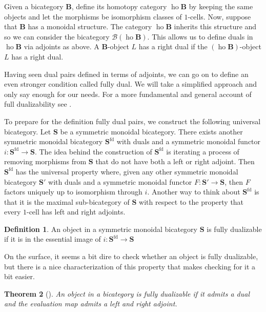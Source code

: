 \documentclass[11pt]{amsart}
\newcommand{\op}[1]{\operatorname{#1}}
\newcommand{\cat}[1]{\mathbf{#1}}
\newcommand{\from}{\colon}
\newtheorem{thm}{Theorem}[section]
\theoremstyle{remark}
\theoremstyle{definition}
\newtheorem{defn}[thm]{Definition}
\begin{document}
Given a bicategory $\cat{B}$, define its homotopy category $\op{ho} \cat{B}$ by keeping the same objects and let the morphisms be isomorphism classes of $1$-cells. Now, suppose that $\cat{B}$ has a monoidal structure. The category $\op{ho} \cat{B}$ inherits this structure and so we can consider the bicategory $\mathcal{B} (\op{ho} \cat{B})$. This allows us to define duals in $\op{ho}\cat{B}$ via adjoints as above. A $\cat{B}$-object $L$ has a right dual if the $(\op{ho} \cat{B})$-object $L$ has a right dual.

Having seen dual pairs defined in terms of adjoints, we can go on to define an even stronger condition called fully dual.  We will take a simplified approach and only say enough for our needs. For a more fundamental and general account of full dualizability see \cite{Lurie,Piotr}. 

To prepare for the definition fully dual pairs, we construct the following universal bicategory. Let $\cat{S}$ be a symmetric monoidal bicategory. There exists another symmetric monoidal bicategory $\cat{S}^{\text{fd}}$ with duals and a symmetric monoidal functor $i \from \cat{S}^{\text{fd}} \to \cat{S}$.  The idea behind the construction of $\cat{S}^{\text{fd}}$ is iterating a process of removing morphisms from $\cat{S}$ that do not have both a left or right adjoint. Then $\cat{S}^{\text{fd}}$ has the universal property where, given any other symmetric monoidal bicategory $\cat{S}'$ with duals and a symmetric monoidal functor $F \from \cat{S}' \to \cat{S}$, then $F$ factors uniquely up to isomorphism through $i$. Another way to think about $\cat{S}^{\text{fd}}$ is that it is the maximal sub-bicategory of $\cat{S}$ with respect to the property that every $1$-cell has left and right adjoints.  

\begin{defn}
\label{def:FullDual}
	An object in a symmetric monoidal bicategory $\cat{S}$ is fully dualizable if it is in the essential image of $i \from \cat{S}^{\text{fd}} \to \cat{S}$
\end{defn}  

On the surface, it seems a bit dire to check whether an object is fully dualizable, but there is a nice characterization of this property that makes checking for it a bit easier.

\begin{thm}[{\cite[Prop.~4.2.3]{Lurie}}]
	An object in a bicategory is fully dualizable if it admits a dual and the evaluation map admits a left and right adjoint.  
\end{thm}
\end{document}
